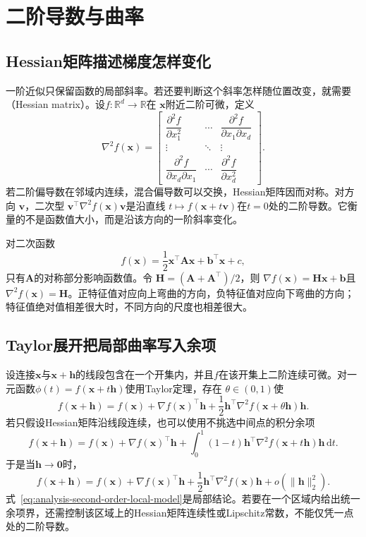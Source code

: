 \section{二阶导数与曲率}
\label{sec:analysis-second-order-curvature}
\subsection{Hessian矩阵描述梯度怎样变化}

一阶近似只保留函数的局部斜率。若还要判断这个斜率怎样随位置改变，就需要
（Hessian matrix）。设$f:\mathbb{R}^d\to\mathbb{R}$在 $\bm{x}$附近二阶可微，定义
\[   \nabla^2 f(\bm{x})   =
\begin{bmatrix}     \dfrac{\partial^2 f}{\partial x_1^2} &     \cdots &     \dfrac{\partial^2 f}{\partial x_1\partial x_d}\\     \vdots & \ddots & \vdots\\     \dfrac{\partial^2 f}{\partial x_d\partial x_1} &     \cdots &     \dfrac{\partial^2 f}{\partial x_d^2}
\end{bmatrix}. \]
若二阶偏导数在邻域内连续，混合偏导数可以交换，Hessian矩阵因而对称。对方向 $\bm{v}$，二次型 $\bm{v}^{\top}\nabla^2f(\bm{x})\bm{v}$是沿直线 $t\mapsto f(\bm{x}+t\bm{v})$在$t=0$处的二阶导数。它衡量的不是函数值大小，而是沿该方向的一阶斜率变化。

对二次函数
\[   f(\bm{x})   =   \frac12\bm{x}^{\top}\bm{A}\bm{x}   +\bm{b}^{\top}\bm{x}+c, \]
只有$\bm{A}$的对称部分影响函数值。令 $\bm{H}=(\bm{A}+\bm{A}^{\top})/2$，则 $\nabla f(\bm{x})=\bm{H}\bm{x}+\bm{b}$且 $\nabla^2f(\bm{x})=\bm{H}$。正特征值对应向上弯曲的方向，负特征值对应向下弯曲的方向；特征值绝对值相差很大时，不同方向的尺度也相差很大。
\subsection{Taylor展开把局部曲率写入余项}

设连接$\bm{x}$与$\bm{x}+\bm{h}$的线段包含在一个开集内，并且$f$在该开集上二阶连续可微。对一元函数$\phi(t)=f(\bm{x}+t\bm{h})$使用Taylor定理，存在 $\theta\in(0,1)$使
\begin{equation}
  f(\bm{x}+\bm{h})
  =
  f(\bm{x})
  +\nabla f(\bm{x})^{\top}\bm{h}
  +\frac12
  \bm{h}^{\top}
  \nabla^2f(\bm{x}+\theta\bm{h})
  \bm{h}.
\label{eq:analysis-second-order-taylor}
\end{equation}
若只假设Hessian矩阵沿线段连续，也可以使用不挑选中间点的积分余项
\[   f(\bm{x}+\bm{h})   =   f(\bm{x})   +\nabla f(\bm{x})^{\top}\bm{h}   +   \int_0^1(1-t)   \bm{h}^{\top}\nabla^2f(\bm{x}+t\bm{h})\bm{h}\,\mathrm{d}t. \]
于是当$\bm{h}\to\bm{0}$时，
\begin{equation}
  f(\bm{x}+\bm{h})
  =
  f(\bm{x})
  +\nabla f(\bm{x})^{\top}\bm{h}
  +\frac12\bm{h}^{\top}\nabla^2f(\bm{x})\bm{h}
  +o(\lVert\bm{h}\rVert_2^2).
\label{eq:analysis-second-order-local-model}
\end{equation}
式~\eqref{eq:analysis-second-order-local-model}是局部结论。若要在一个区域内给出统一余项界，还需控制该区域上的Hessian矩阵连续性或Lipschitz常数，不能仅凭一点处的二阶导数。
